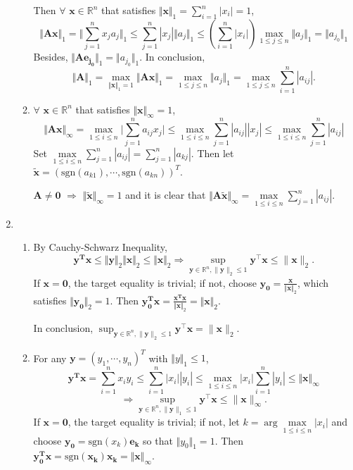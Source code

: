 \documentclass[11pt,letter,notitlepage]{article}
\theoremstyle{definition}
\begin{document}
\begin{solution}
\begin{enumerate}
\begin{enumerate}
		Then $\forall$ $\mathbf{x}\in\mathbb{R}^n$ that satisfies $\Vert \mathbf{x} \Vert_1 = \sum\limits_{i=1}^{n}|x_i| = 1$,
		\[
		\Vert \mathbf{Ax} \Vert_1 = \Vert \sum\limits_{j=1}^{n} x_j a_j \Vert_1 \leq \sum\limits_{j=1}^{n} |x_j|\Vert a_j \Vert_1 \leq \left(\sum\limits_{i=1}^{n}|x_i|\right) \max\limits_{1 \leq j \leq n}\Vert a_j \Vert_1 = \Vert a_{j_0} \Vert_1
		\]
		Besides, $\Vert \mathbf{A e_{j_0}} \Vert_1 = \Vert a_{j_0} \Vert_1$.
		In conclusion, 
		\[
		\Vert \mathbf{A} \Vert_1 = \max\limits_{\Vert \mathbf{x} \Vert_1 = 1} \Vert \mathbf{Ax} \Vert_1 = \max\limits_{1 \leq j \leq n} \Vert a_j \Vert_1 = \max\limits_{1 \leq j \leq n}\sum\limits_{i=1}^{n}|a_{ij}|.
		\]
		\item $\forall$ $\mathbf{x}\in\mathbb{R}^n$ that satisfies $\Vert \mathbf{x} \Vert_{\infty} = 1$,
		\[
		\Vert \mathbf{Ax} \Vert_{\infty} = \max\limits_{1 \leq i \leq n}\Big|\sum\limits_{j=1}^{n}a_{ij}x_{j}\Big| \leq \max\limits_{1 \leq i \leq n}\sum\limits_{j=1}^{n}|a_{ij}||x_j| \leq \max\limits_{1 \leq i \leq n}\sum\limits_{j=1}^{n}|a_{ij}|
		\]
		Set $\max\limits_{1 \leq i \leq n} \sum\limits_{j=1}^{n}|a_{ij}| = \sum\limits_{j=1}^{n} |a_{kj}|$. Then let $\mathbf{\tilde{x}} = \left(\text{sgn}(a_{k1}), \cdots, \text{sgn}(a_{kn})\right)^{T}$.

		$\mathbf{A} \neq \mathbf{0}$ $\Longrightarrow$ $\Vert \mathbf{\tilde{x}} \Vert_{\infty} = 1$ and it is clear that $\Vert \mathbf{A\tilde{x}} \Vert_{\infty} = \max\limits_{1 \leq i \leq n}\sum\limits_{j=1}^{n}|a_{ij}|$.
	\end{enumerate}
\item
	\begin{enumerate}
		\item By Cauchy-Schwarz Inequality,
		\[
		\mathbf{y^{T}x} \leq \Vert \mathbf{y} \Vert_2 \Vert \mathbf{x} \Vert_2 \leq \Vert \mathbf{x} \Vert_2
		\Longrightarrow
		\sup_{\mathbf{y}\in \mathbb{R}^n, \|\mathbf{y}\|_2\le 1}\mathbf{y}^{\top}\mathbf{x} \leq \|\mathbf{x}\|_2.
		\]
		If $\mathbf{x} = \mathbf{0}$, the target equality is trivial; if not, choose $\mathbf{y_0} = \frac{\mathbf{x}}{\Vert \mathbf{x} \Vert_2}$, which satisfies $\Vert \mathbf{y_0} \Vert_2 = 1$. Then $\mathbf{y_0^{T}x} = \frac{\mathbf{x^{T}x}}{\Vert \mathbf{x} \Vert_2} = \Vert \mathbf{x} \Vert_2$.

		In conclusion, $\sup_{\mathbf{y}\in \mathbb{R}^n, \|\mathbf{y}\|_2\le 1}\mathbf{y}^{\top}\mathbf{x} = \|\mathbf{x}\|_2$.
		\item For any $\mathbf{y} = (y_1, \cdots, y_n)^{T}$ with $\Vert y \Vert_1 \leq 1$,
		\[
		\mathbf{y^{T}x} = \sum\limits_{i=1}^{n}x_i y_i \leq \sum\limits_{i=1}^{n}|x_i||y_i| \leq \max\limits_{1 \leq i \leq n}|x_i| \sum\limits_{i=1}^{n}|y_i| \leq \Vert \mathbf{x} \Vert_{\infty}
		\]
		\[
		\Longrightarrow
		\sup_{\mathbf{y}\in \mathbb{R}^n, \|\mathbf{y}\|_1\le 1}\mathbf{y}^{\top}\mathbf{x} \leq \|\mathbf{x}\|_{\infty}.
		\]
		If $\mathbf{x} = \mathbf{0}$, the target equality is trivial; if not, let $k = \arg \max\limits_{1 \leq i \leq n}|x_i|$ and choose $\mathbf{y_0} = \text{sgn}(x_k)\mathbf{e_{k}}$ so that $\Vert y_0 \Vert_1 = 1$. Then $\mathbf{y_0^{T}x} = \text{sgn}(\mathbf{x_k})\mathbf{x_k} = \Vert \mathbf{x} \Vert_{\infty}$.


\end{enumerate}
\end{enumerate}
\end{solution}
\end{document}

